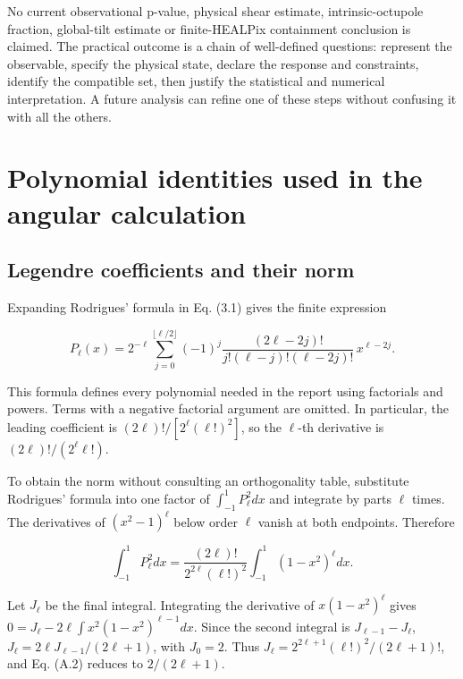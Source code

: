 \documentclass[
  11pt,
  a4paper]{article}
\begin{document}
No current observational p-value, physical shear estimate, intrinsic-octupole fraction, global-tilt estimate or finite-HEALPix containment conclusion is claimed. The practical outcome is a chain of well-defined questions: represent the observable, specify the physical state, declare the response and constraints, identify the compatible set, then justify the statistical and numerical interpretation. A future analysis can refine one of these steps without confusing it with all the others.

\appendix

\hypertarget{appendix-a.-polynomial-identities-used-in-the-angular-calculation}{%
\section{Polynomial identities used in the angular calculation}\label{appendix-a.-polynomial-identities-used-in-the-angular-calculation}}

\hypertarget{a.1-legendre-coefficients-and-their-norm}{%
\subsection{Legendre coefficients and their norm}\label{a.1-legendre-coefficients-and-their-norm}}

Expanding Rodrigues' formula in Eq. (3.1) gives the finite expression

\[
P_\ell(x)=2^{-\ell}\sum_{j=0}^{\lfloor\ell/2\rfloor}
(-1)^j\frac{(2\ell-2j)!}{j!(\ell-j)!(\ell-2j)!}\,x^{\ell-2j}.
\tag{A.1}
\]

This formula defines every polynomial needed in the report using factorials and powers. Terms with a negative factorial argument are omitted. In particular, the leading coefficient is \((2\ell)!/[2^\ell(\ell!)^2]\), so the \(\ell\)-th derivative is \((2\ell)!/(2^\ell\ell!)\).

To obtain the norm without consulting an orthogonality table, substitute Rodrigues' formula into one factor of \(\int_{-1}^1P_\ell^2dx\) and integrate by parts \(\ell\) times. The derivatives of \((x^2-1)^\ell\) below order \(\ell\) vanish at both endpoints. Therefore

\[
\int_{-1}^1P_\ell^2dx
=\frac{(2\ell)!}{2^{2\ell}(\ell!)^2}
\int_{-1}^1(1-x^2)^\ell dx.
\tag{A.2}
\]

Let \(J_\ell\) be the final integral. Integrating the derivative of \(x(1-x^2)^\ell\) gives
\(0=J_\ell-2\ell\int x^2(1-x^2)^{\ell-1}dx\).
Since the second integral is \(J_{\ell-1}-J_\ell\),
\(J_\ell=2\ell J_{\ell-1}/(2\ell+1)\), with \(J_0=2\).
Thus
\(J_\ell=2^{2\ell+1}(\ell!)^2/(2\ell+1)!\), and Eq. (A.2) reduces to \(2/(2\ell+1)\).
\end{document}
